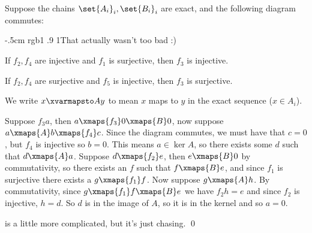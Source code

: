 
\blemm[title=The Lemma of Five]

    Suppose the chains $\set{A_i}_i,\set{B_i}_i$ are exact, and the following diagram commutes:

    \medskip
    \centerline{\def\diagrowheight{1cm}\def\diagcolwidth{1cm}}

    \kern-.5cm
    \localcolor rgb{1 .9 1}{That actually wasn't too bad :)}

    \benum
        \item If $f_2,f_4$ are injective and $f_1$ is surjective, then $f_3$ is injective.
        \item If $f_2,f_4$ are surjective and $f_5$ is injective, then $f_3$ is surjective.
    \eenum

\elemm

\Proof We write $x\xvarmapsto Ay$ to mean $x$ maps to $y$ in the exact sequence ($x\in A_i$).
\benum
    \item Suppose $f_3a$, then $a\xmaps{f_3}0\xmaps{B}0$, now suppose $a\xmaps{A}b\xmaps{f_4}c$.
        Since the diagram commutes, we must have that $c=0$, but $f_4$ is injective so $b=0$.
        This means $a\in\ker A$, so there exists some $d$ such that $d\xmaps{A}a$.
        Suppose $d\xmaps{f_2}e$, then $e\xmaps{B}0$ by commutativity, so there exists an $f$ such that $f\xmaps{B}e$, and since $f_1$ is surjective there exists a $g\xmaps{f_1}f$.
        Now suppose $g\xmaps{A}h$.
        By commutativity, since $g\xmaps{f_1}f\xmaps{B}e$ we have $f_2h=e$ and since $f_2$ is injective, $h=d$.
        So $d$ is in the image of $A$, so it is in the kernel and so $a=0$.
    \item is a little more complicated, but it's just chasing.
        \qed
\eenum

